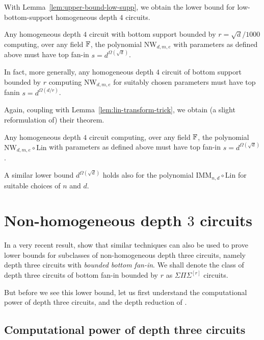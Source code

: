\documentclass[12pt]{report}
\newcommand{\SPS}{\Sigma\Pi\Sigma}
\newcommand{\NW}{\mathrm{NW}}
\begin{document}
With Lemma~\ref{lem:upper-bound-low-supp}, we obtain the lower bound for low-bottom-support homogeneous depth $4$ circuits. 

\begin{theorem}[\cite{KS14}]\label{thm:IMM-lowsup-lb}
Any homogeneous depth $4$ circuit with bottom support bounded by $r = \sqrt{d}/1000$ computing, over any field $\mathbb{F}$, the polynomial $\NW_{d,m,e}$ with parameters as defined above must have top fan-in $s = d^{\Omega(\sqrt{d})}$. 

In fact, more generally, any homogeneous depth $4$ circuit of bottom support bounded by $r$ computing $\NW_{d,m,e}$ for suitably chosen parameters must have top fanin $s = d^{\Omega(d/r)}$. 
\end{theorem}

Again, coupling with Lemma~\ref{lem:lin-transform-trick}, we obtain (a slight reformulation of) their theorem. 

\begin{theorem}\label{thm:IMM-lb}
Any homogeneous depth $4$ circuit computing, over any field $\mathbb{F}$,  the polynomial $\NW_{d,m,e}\circ \mathrm{Lin}$ with parameters as defined above must have top fan-in $s = d^{\Omega(\sqrt{d})}$. 

A similar lower bound $d^{\Omega(\sqrt{d})}$ holds also for the polynomial $\mathrm{IMM}_{n,d} \circ \mathrm{Lin}$ for suitable choices of $n$ and $d$. 
\end{theorem}

\section{Non-homogeneous depth $3$ circuits}\label{sec:kayalsaha}

In a very recent result, \cite{KayalSaha14} show that similar techniques can also be used to prove lower bounds for subclasses of non-homogeneous depth three circuits, namely depth three circuits with \emph{bounded bottom fan-in}. We shall denote the class of depth three circuits of bottom fan-in bounded by $r$ as $\SPS^{[r]}$ circuits. 

But before we see this lower bound, let us first understand the computational power of depth three circuits, and the depth reduction of \cite{gkks13b}. 

\subsection{Computational power of depth three circuits}
\end{document}
